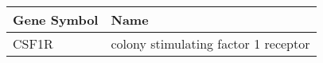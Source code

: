 \begin{tabular}{ll}
\toprule
Gene Symbol &                                 Name \\
\midrule
      CSF1R & colony stimulating factor 1 receptor \\
\bottomrule
\end{tabular}
